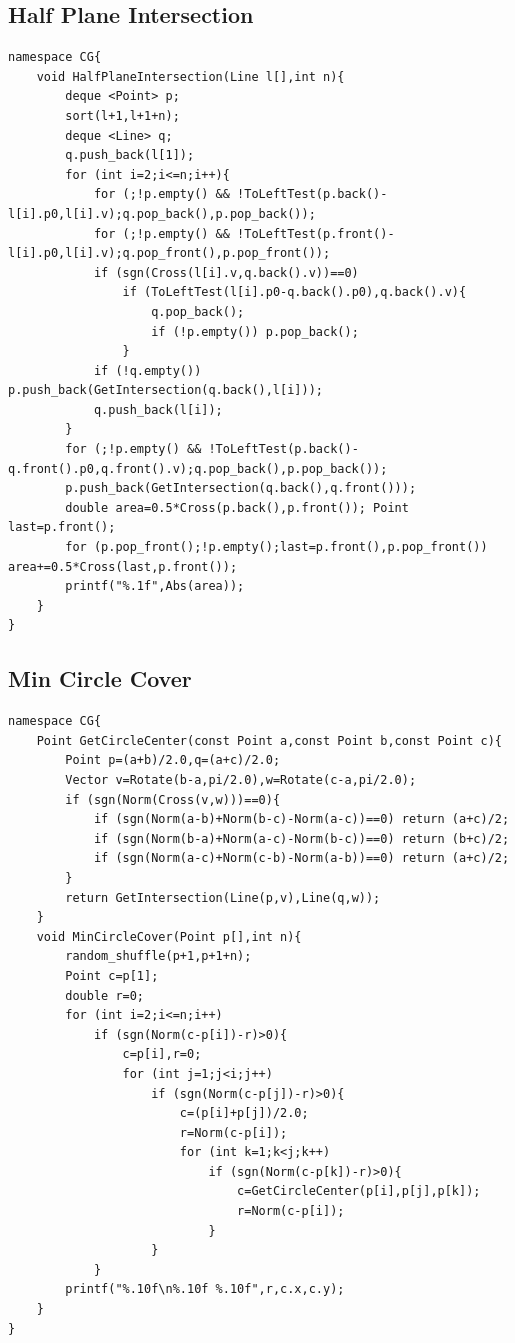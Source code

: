 \documentclass[10pt]{ctexart}
\begin{document}
{{\subsection{Half Plane Intersection}
\begin{lstlisting}
namespace CG{
    void HalfPlaneIntersection(Line l[],int n){
        deque <Point> p;
        sort(l+1,l+1+n);
        deque <Line> q;
        q.push_back(l[1]);
        for (int i=2;i<=n;i++){
            for (;!p.empty() && !ToLeftTest(p.back()-l[i].p0,l[i].v);q.pop_back(),p.pop_back());
            for (;!p.empty() && !ToLeftTest(p.front()-l[i].p0,l[i].v);q.pop_front(),p.pop_front());
            if (sgn(Cross(l[i].v,q.back().v))==0)
                if (ToLeftTest(l[i].p0-q.back().p0),q.back().v){
                    q.pop_back();
                    if (!p.empty()) p.pop_back();
                }
            if (!q.empty()) p.push_back(GetIntersection(q.back(),l[i]));
            q.push_back(l[i]);
        }
        for (;!p.empty() && !ToLeftTest(p.back()-q.front().p0,q.front().v);q.pop_back(),p.pop_back());
        p.push_back(GetIntersection(q.back(),q.front()));
        double area=0.5*Cross(p.back(),p.front()); Point last=p.front();
        for (p.pop_front();!p.empty();last=p.front(),p.pop_front()) area+=0.5*Cross(last,p.front());
        printf("%.1f",Abs(area));
    }
}
\end{lstlisting}
\subsection{Min Circle Cover}
\begin{lstlisting}
namespace CG{
    Point GetCircleCenter(const Point a,const Point b,const Point c){
        Point p=(a+b)/2.0,q=(a+c)/2.0;
        Vector v=Rotate(b-a,pi/2.0),w=Rotate(c-a,pi/2.0);
        if (sgn(Norm(Cross(v,w)))==0){
            if (sgn(Norm(a-b)+Norm(b-c)-Norm(a-c))==0) return (a+c)/2;
            if (sgn(Norm(b-a)+Norm(a-c)-Norm(b-c))==0) return (b+c)/2;
            if (sgn(Norm(a-c)+Norm(c-b)-Norm(a-b))==0) return (a+c)/2;
        }
        return GetIntersection(Line(p,v),Line(q,w));
    }
    void MinCircleCover(Point p[],int n){
        random_shuffle(p+1,p+1+n);
        Point c=p[1];
        double r=0;
        for (int i=2;i<=n;i++)
            if (sgn(Norm(c-p[i])-r)>0){
                c=p[i],r=0;
                for (int j=1;j<i;j++)
                    if (sgn(Norm(c-p[j])-r)>0){
                        c=(p[i]+p[j])/2.0;
                        r=Norm(c-p[i]);
                        for (int k=1;k<j;k++)
                            if (sgn(Norm(c-p[k])-r)>0){
                                c=GetCircleCenter(p[i],p[j],p[k]);
                                r=Norm(c-p[i]);
                            }
                    }
            }
        printf("%.10f\n%.10f %.10f",r,c.x,c.y);
    }
}
\end{lstlisting}
}}
\end{document}
